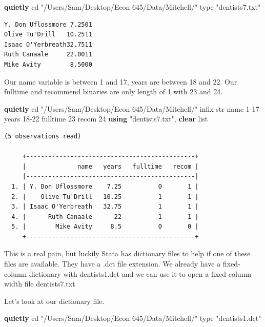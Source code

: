 \documentclass[
]{book}
\newenvironment{Shaded}{\begin{snugshade}}{\end{snugshade}}
\newcommand{\BaseNTok}[1]{\textcolor[rgb]{0.00,0.00,0.81}{#1}}
\newcommand{\DecValTok}[1]{\textcolor[rgb]{0.00,0.00,0.81}{#1}}
\newcommand{\KeywordTok}[1]{\textcolor[rgb]{0.13,0.29,0.53}{\textbf{#1}}}
\newcommand{\NormalTok}[1]{#1}
\newcommand{\OtherTok}[1]{\textcolor[rgb]{0.56,0.35,0.01}{#1}}
\newcommand{\StringTok}[1]{\textcolor[rgb]{0.31,0.60,0.02}{#1}}
\begin{document}
\begin{Shaded}
\begin{Highlighting}[]
\KeywordTok{quietly}\NormalTok{ cd }\StringTok{"/Users/Sam/Desktop/Econ 645/Data/Mitchell/"}
\DecValTok{type} \StringTok{"dentists7.txt"}
\end{Highlighting}
\end{Shaded}

\begin{verbatim}
Y. Don Uflossmore 7.2501
Olive Tu'Drill   10.2511
Isaac O'Yerbreath32.7511
Ruth Canaale     22.0011
Mike Avity        8.5000
\end{verbatim}

Our name variable is between 1 and 17, years are between 18 and 22. Our fulltime and recommend binaries are only length of 1 with 23 and 24.

\begin{Shaded}
\begin{Highlighting}[]
\KeywordTok{quietly}\NormalTok{ cd }\StringTok{"/Users/Sam/Desktop/Econ 645/Data/Mitchell/"}
\NormalTok{infix str }\BaseNTok{name}\NormalTok{ 1{-}17 years 18{-}22 fulltime 23 recom 24 }\KeywordTok{using} \StringTok{"dentists7.txt"}\NormalTok{, }\KeywordTok{clear}
\OtherTok{list}
\end{Highlighting}
\end{Shaded}

\begin{verbatim}
(5 observations read)

     +----------------------------------------------+
     |              name   years   fulltime   recom |
     |----------------------------------------------|
  1. | Y. Don Uflossmore    7.25          0       1 |
  2. |    Olive Tu'Drill   10.25          1       1 |
  3. | Isaac O'Yerbreath   32.75          1       1 |
  4. |      Ruth Canaale      22          1       1 |
  5. |        Mike Avity     8.5          0       0 |
     +----------------------------------------------+
\end{verbatim}

This is a real pain, but luckily Stata has dictionary files to help if one of these files are available. They have a .dct file extension. We already have a fixed-column dictionary with dentists1.dct and we can use it to open a fixed-column width file dentists7.txt

Let's look at our dictionary file.

\begin{Shaded}
\begin{Highlighting}[]
\KeywordTok{quietly}\NormalTok{ cd }\StringTok{"/Users/Sam/Desktop/Econ 645/Data/Mitchell/"}
\DecValTok{type} \StringTok{"dentists1.dct"}
\end{Highlighting}
\end{Shaded}
\end{document}

